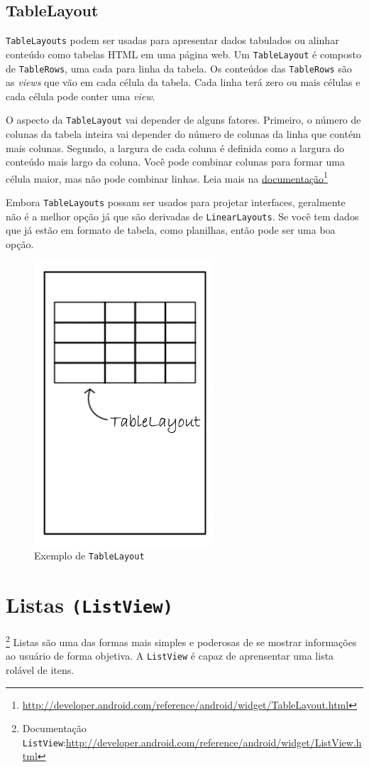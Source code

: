\documentclass[a4paper,12pt,brazil,oneside]{book}
\begin{document}
\begin{singlespace}
\subsection{TableLayout}

\texttt{TableLayouts} podem ser usadas para apresentar dados tabulados ou alinhar conteúdo como tabelas HTML em uma página web. Um \texttt{TableLayout} é composto de \texttt{TableRows}, uma cada para linha da tabela. Os conteúdos das \texttt{TableRows} são as \emph{views} que vão em cada célula da tabela. Cada linha terá zero ou mais células e cada célula pode conter uma \emph{view}. 

O aspecto da \texttt{TableLayout} vai depender de alguns fatores. Primeiro, o número de colunas da tabela inteira vai depender do número de colunas da linha que contém mais colunas. Segundo, a largura de cada coluna é definida como a largura do conteúdo mais largo da coluna. Você pode combinar colunas para formar uma célula maior, mas não pode combinar linhas. Leia mais na \href{http://developer.android.com/reference/android/widget/TableLayout.html}{documentação}\footnote{\href{http://developer.android.com/reference/android/widget/TableLayout.html}{http://developer.android.com/reference/android/widget/TableLayout.html}}

Embora \texttt{TableLayouts} possam ser usados para projetar interfaces, geralmente não é a melhor opção já que são derivadas de \texttt{LinearLayouts}. Se você tem dados que já estão em formato de tabela, como planilhas, então pode ser uma boa opção.

\begin{figure}[H]
  \centering
  \includegraphics[width=.25\textwidth]{figuras/design/tablelayout.jpg}
  \caption{Exemplo de \texttt{TableLayout}}
  \label{fig:e7}
\end{figure}

\section{Listas \texttt{(ListView)}}\footnote{Documentação \texttt{ListView}:\href{http://developer.android.com/reference/android/widget/ListView.html}{http://developer.android.com/reference/android/widget/ListView.html}}
Listas são uma das formas mais simples e poderosas de se mostrar informações ao usuário de forma objetiva. A \texttt{ListView} é capaz de aprensentar uma lista rolável de itens. 


\end{singlespace}
\end{document}
